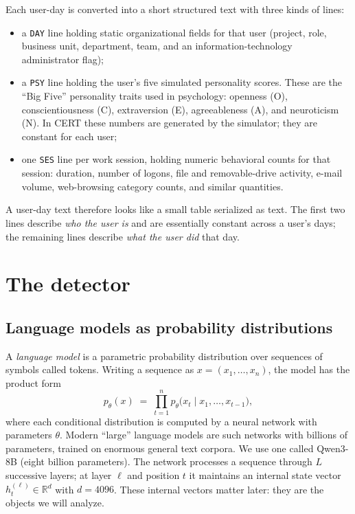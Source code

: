 \documentclass[10pt]{article}
\begin{document}
Each user-day is converted into a short structured text with three kinds
of lines:
\begin{itemize}
\item a \texttt{DAY} line holding static organizational fields for that
user (project, role, business unit, department, team, and an
information-technology administrator flag);
\item a \texttt{PSY} line holding the user's five simulated personality
scores. These are the ``Big Five'' personality traits used in
psychology: openness (O), conscientiousness (C), extraversion (E),
agreeableness (A), and neuroticism (N). In CERT these numbers are
generated by the simulator; they are constant for each user;
\item one \texttt{SES} line per work session, holding numeric behavioral
counts for that session: duration, number of logons, file and
removable-drive activity, e-mail volume, web-browsing category counts,
and similar quantities.
\end{itemize}
A user-day text therefore looks like a small table serialized as text.
The first two lines describe \emph{who the user is} and are essentially
constant across a user's days; the remaining lines describe \emph{what
the user did} that day.

\section{The detector}

\subsection{Language models as probability distributions}

A \emph{language model} is a parametric probability distribution over
sequences of symbols called tokens. Writing a sequence as
$x = (x_1, \dots, x_n)$, the model has the product form
\begin{equation}
p_\theta(x) \;=\; \prod_{t=1}^{n} p_\theta\bigl(x_t \mid x_1, \dots,
x_{t-1}\bigr),
\end{equation}
where each conditional distribution is computed by a neural network with
parameters $\theta$. Modern ``large'' language models are such networks
with billions of parameters, trained on enormous general text corpora.
We use one called Qwen3-8B (eight billion parameters). The network
processes a sequence through $L$ successive layers; at layer $\ell$ and
position $t$ it maintains an internal state vector
$h^{(\ell)}_t \in \mathbb{R}^{d}$ with $d = 4096$. These internal
vectors matter later: they are the objects we will analyze.
\end{document}
